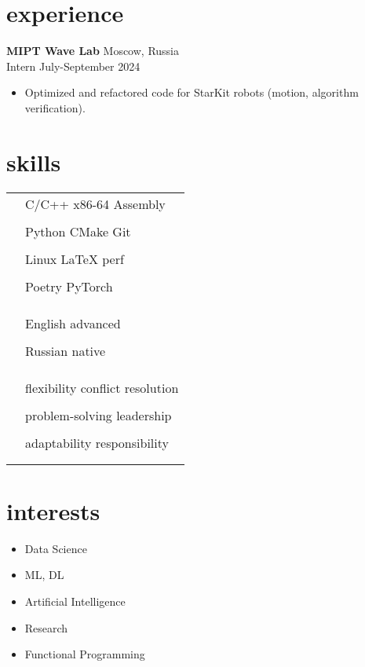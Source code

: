 \documentclass[12pt]{article}
\newcommand{\entry}[4]{{{\textbf{#1}}} \hfill #3 \\ #2 \hfill #4}
\newcommand{\tableentry}[3]{\textsc{#1} & #2\expandafter\ifstrequal\expandafter{#3}{}{\\}{\\[6pt]}}
\begin{document}
\begin{paracol}{2}
		
		\section{experience}
		
		\entry{MIPT Wave Lab}{Intern}{Moscow, Russia}{July-September 2024}
		\begin{itemize}[noitemsep,leftmargin=3.5mm,rightmargin=0mm,topsep=6pt]
			\item Optimized and refactored code for StarKit robots (motion, algorithm verification).
		\end{itemize}
		
		\switchcolumn
		
		\section{skills}
		\begin{supertabular}{rl}
			\tableentry{\footnotesize\faCode}{C/C++ \textperiodcentered{} x86-64 Assembly}{}
			\tableentry{}{Python \textperiodcentered{} CMake \textperiodcentered{} Git}{}
			\tableentry{}{Linux
				\textperiodcentered{} LaTeX \textperiodcentered{} perf}{}
			\tableentry{}{Poetry \textperiodcentered{} PyTorch}{}
			
			
			\tableentry{}{}{}
			
			\tableentry{\footnotesize\faLanguage}{English \textperiodcentered{} advanced}{}
			\tableentry{}{Russian \textperiodcentered{} native}{}
			\tableentry{}{}{}
			
			\tableentry{\footnotesize\faComments}{flexibility \textperiodcentered{} conflict resolution}{}
			\tableentry{}{problem-solving \textperiodcentered{} leadership}{}
			\tableentry{}{adaptability \textperiodcentered{} responsibility}{}
		\end{supertabular}
		
		\section{interests}
		\begin{itemize}[noitemsep,leftmargin=3.5mm,rightmargin=0mm,topsep=6pt]
			\item Data Science
			\item ML, DL
			\item Artificial Intelligence
			\item Research
			\item Functional Programming
		\end{itemize}
		

\end{paracol}
\end{document}
